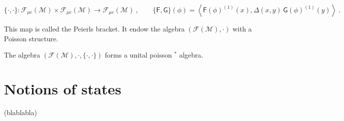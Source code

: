 \documentclass[10pt]{book}
\newcommand{\sm}[1]{\left\langle#1\right\rangle}
\newcommand{\Fcal}{\mathcal{F}}
\newcommand{\Mcal}{\mathcal{M}}
\newcommand{\Fsf}{\mathsf{F}}
\newcommand{\Gsf}{\mathsf{G}}
\newcommand{\Usf}{\mathsf{U}}
\theoremstyle{break}
\begin{document}




\begin{equation}
\{\cdot,\cdot\} : \Fcal_{\mu c}(\Mcal) \times \Fcal_{\mu c}(\Mcal) \to \Fcal_{\mu c}(\Mcal) \ ,
\qquad
\{\Fsf,\Gsf\}(\phi) = \sm{\Fsf(\phi)^{(1)}(x) , \Delta(x,y) \ \Gsf(\phi)^{(1)}(y)} \ .
\end{equation}

This map is called the Peierls bracket. It endow the algebra $(\Fcal(\Mcal),\cdot)$ with a Poisson structure.


The algebra $\left(\Fcal(\Mcal), \cdot , \{\cdot,\cdot\}\right)$ forms a unital poisson $^\ast$ algebra.



\section{Notions of states}



(blablabla)




%
%
\end{document}
